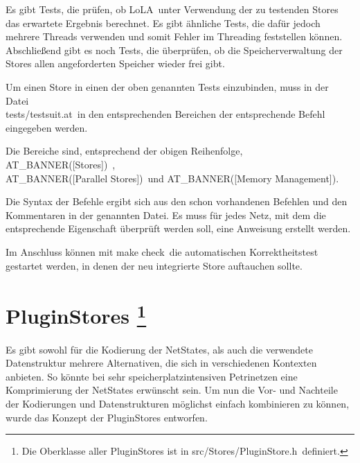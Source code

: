 \documentclass[12pt,a4paper,titlepage]{scrartcl}
\renewcommand \( {\left (}
\renewcommand \) {\right )}
\renewcommand \[ {\left [}
\renewcommand \] {\right ]}
\newcommand \Flqq {\flqq\ }
\newcommand{\lola}{\frqq LoLA\Flqq}
\begin{document}
Es gibt Tests, die prüfen, ob \lola unter Verwendung der zu testenden Stores das erwartete Ergebnis berechnet. Es gibt ähnliche Tests, die dafür jedoch mehrere Threads verwenden und somit Fehler im Threading feststellen können. Abschließend gibt es noch Tests, die überprüfen, ob die Speicherverwaltung der Stores allen angeforderten Speicher wieder frei gibt.

Um einen Store in einen der oben genannten Tests einzubinden, muss in der Datei
\\\frqq tests/testsuit.at\Flqq in den entsprechenden Bereichen der entsprechende Befehl eingegeben werden.

Die Bereiche sind, entsprechend der obigen Reihenfolge, \frqq AT\_BANNER([Stores])\Flqq,\\\frqq AT\_BANNER([Parallel Stores])\Flqq und \frqq AT\_BANNER([Memory Management])\flqq.

Die Syntax der Befehle ergibt sich aus den schon vorhandenen Befehlen und den Kommentaren in der genannten Datei. Es muss für jedes Netz, mit dem die entsprechende Eigenschaft überprüft werden soll, eine Anweisung erstellt werden.

Im Anschluss können mit \frqq make check\Flqq die automatischen Korrektheitstest gestartet werden, in denen der neu integrierte Store auftauchen sollte.


\section{PluginStores
\protect\footnote{Die Oberklasse aller PluginStores ist in \frqq src/Stores/PluginStore.h\Flqq definiert.}}
\label{kap:PluginStores}
Es gibt sowohl für die Kodierung der NetStates, als auch die verwendete Datenstruktur mehrere Alternativen, die sich in verschiedenen Kontexten anbieten. So könnte bei sehr speicherplatzintensiven Petrinetzen eine Komprimierung der NetStates erwünscht sein. Um nun die Vor- und Nachteile der Kodierungen und Datenstrukturen möglichst einfach kombinieren zu können, wurde das Konzept der PluginStores entworfen.
\end{document}
